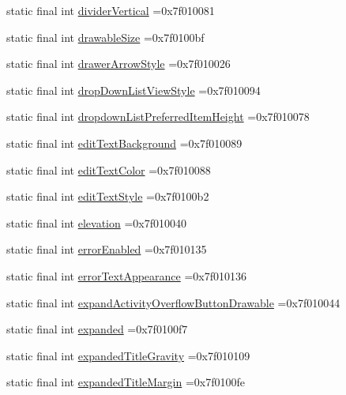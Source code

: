 \begin{DoxyCompactItemize}
\item 
static final int \hyperlink{classproject4_1_1xaria_1_1R_1_1attr_ae52e420b949d1eea057825fa5dfaa5ab}{divider\+Vertical} =0x7f010081
\item 
static final int \hyperlink{classproject4_1_1xaria_1_1R_1_1attr_aaa603362b15526875c64569e92661460}{drawable\+Size} =0x7f0100bf
\item 
static final int \hyperlink{classproject4_1_1xaria_1_1R_1_1attr_aa885f069e272d2543443cc40aa3798bd}{drawer\+Arrow\+Style} =0x7f010026
\item 
static final int \hyperlink{classproject4_1_1xaria_1_1R_1_1attr_ad63e65ddbc7cce36f753b749495b3631}{drop\+Down\+List\+View\+Style} =0x7f010094
\item 
static final int \hyperlink{classproject4_1_1xaria_1_1R_1_1attr_a0a7dc0229f535ad81ecb44f0614dda82}{dropdown\+List\+Preferred\+Item\+Height} =0x7f010078
\item 
static final int \hyperlink{classproject4_1_1xaria_1_1R_1_1attr_a2ba4243073405f6dcd8b6efe82890258}{edit\+Text\+Background} =0x7f010089
\item 
static final int \hyperlink{classproject4_1_1xaria_1_1R_1_1attr_adc78a421870c92acb64dacb5f5fe7106}{edit\+Text\+Color} =0x7f010088
\item 
static final int \hyperlink{classproject4_1_1xaria_1_1R_1_1attr_ab7364a1af6c8189428d71b9a28392d8e}{edit\+Text\+Style} =0x7f0100b2
\item 
static final int \hyperlink{classproject4_1_1xaria_1_1R_1_1attr_a9b73be576782af619051dcac6ba7c7cc}{elevation} =0x7f010040
\item 
static final int \hyperlink{classproject4_1_1xaria_1_1R_1_1attr_a6882a022a9acc52f7d2350974ef53dbf}{error\+Enabled} =0x7f010135
\item 
static final int \hyperlink{classproject4_1_1xaria_1_1R_1_1attr_a12b8d454a6d641cd6be5cc768a415661}{error\+Text\+Appearance} =0x7f010136
\item 
static final int \hyperlink{classproject4_1_1xaria_1_1R_1_1attr_a5f39b21c9952ebd1798d6d779181a3c8}{expand\+Activity\+Overflow\+Button\+Drawable} =0x7f010044
\item 
static final int \hyperlink{classproject4_1_1xaria_1_1R_1_1attr_aca8c18f895ce6f487f269b27904f9673}{expanded} =0x7f0100f7
\item 
static final int \hyperlink{classproject4_1_1xaria_1_1R_1_1attr_a24bda2e246427c0b3c408a2f9591b724}{expanded\+Title\+Gravity} =0x7f010109
\item 
static final int \hyperlink{classproject4_1_1xaria_1_1R_1_1attr_a1d9d9ed4f17df16b8b4611683f70f25e}{expanded\+Title\+Margin} =0x7f0100fe

\end{DoxyCompactItemize}
